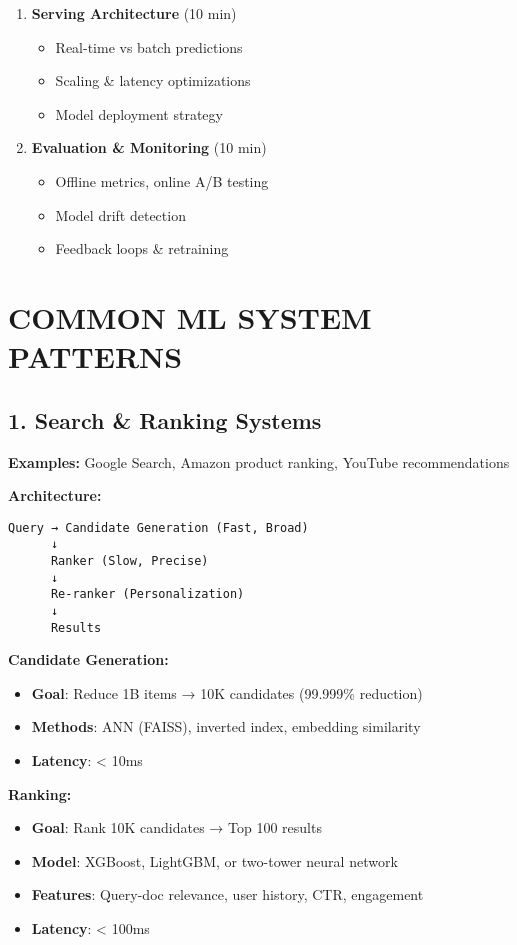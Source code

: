 \documentclass[8pt,landscape]{article}
\begin{document}
\begin{multicols}{3}
\begin{enumerate}
\item \textbf{Serving Architecture} (10 min)
\begin{itemize}
\item Real-time vs batch predictions
\item Scaling \& latency optimizations
\item Model deployment strategy
\end{itemize}

\item \textbf{Evaluation \& Monitoring} (10 min)
\begin{itemize}
\item Offline metrics, online A/B testing
\item Model drift detection
\item Feedback loops \& retraining
\end{itemize}
\end{enumerate}

\section*{COMMON ML SYSTEM PATTERNS}

\subsection*{1. Search \& Ranking Systems}
\textbf{Examples:} Google Search, Amazon product ranking, YouTube recommendations

\textbf{Architecture:}
\begin{verbatim}
Query → Candidate Generation (Fast, Broad)
      ↓
      Ranker (Slow, Precise)
      ↓
      Re-ranker (Personalization)
      ↓
      Results
\end{verbatim}

\textbf{Candidate Generation:}
\begin{itemize}
\item \textbf{Goal}: Reduce 1B items → 10K candidates (99.999\% reduction)
\item \textbf{Methods}: ANN (FAISS), inverted index, embedding similarity
\item \textbf{Latency}: < 10ms
\end{itemize}

\textbf{Ranking:}
\begin{itemize}
\item \textbf{Goal}: Rank 10K candidates → Top 100 results
\item \textbf{Model}: XGBoost, LightGBM, or two-tower neural network
\item \textbf{Features}: Query-doc relevance, user history, CTR, engagement
\item \textbf{Latency}: < 100ms
\end{itemize}


\end{multicols}
\end{document}

